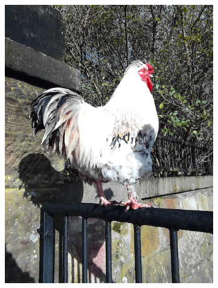 \documentclass{l4proj}
\begin{document}
\begin{figure}[ht]
\begin{subfigure}[h!]{0.18\textwidth}
    \includegraphics[width=\textwidth, trim={0cm 2.5cm 0cm 2.5cm}, clip]{images/dataset/chicken/rgb.png}

\end{subfigure}
\end{figure}
\end{document}
